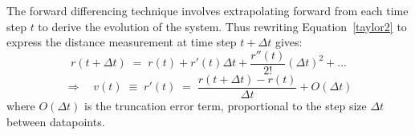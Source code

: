 \documentclass[namedreferences]{SolarPhysics}
\begin{document}
\begin{article}
The forward differencing technique involves extrapolating forward from each time step $t$ to derive the evolution of the system. Thus rewriting Equation~\ref{taylor2} to express the distance measurement at time step $t+\Delta t$ gives:
\begin{equation}
r(t + \Delta t) \; = \; r(t) + r'(t)\Delta t +  \frac{r''(t)}{2!}(\Delta t)^{2} + ...
\end{equation}
\begin{equation}
\Rightarrow \quad v(t) \; \equiv \; r'(t) \; = \; \frac{r(t + \Delta t) - r(t)}{\Delta t} + O(\Delta t)
\end{equation}
where $O(\Delta t)$ is the truncation error term, proportional to the step size $\Delta t$ between datapoints. %

\end{article}
\end{document}
